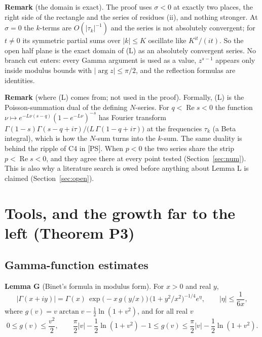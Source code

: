 \documentclass[11pt]{article}
\newcommand{\re}{\operatorname{Re}}
\begin{document}
\noindent\textbf{Remark} (the domain is exact). The proof uses $\sigma<0$ at exactly two places, the right side of the rectangle and the series of residues (ii), and nothing stronger. At $\sigma=0$ the $k$-terms are $O(|\tau_k|^{-1})$ and the series is not absolutely convergent; for $t\ne0$ its symmetric partial sums over $|k|\le K$ oscillate like $K^{it}/(it)$. So the open half plane is the exact domain of (L) as an absolutely convergent series. No branch cut enters: every Gamma argument is used as a value, $z^{s-1}$ appears only inside modulus bounds with $|\arg z|\le\pi/2$, and the reflection formulas are identities.

\medskip
\noindent\textbf{Remark} (where (L) comes from; not used in the proof). Formally, (L) is the Poisson-summation dual of the defining $N$-series. For $q<\re s<0$ the function $\nu\mapsto e^{-L\nu(s-q)}(1-e^{-L\nu})^{-s}$ has Fourier transform $\Gamma(1-s)\Gamma(s-q+i\tau)/\bigl(L\,\Gamma(1-q+i\tau)\bigr)$ at the frequencies $\tau_k$ (a Beta integral), which is how the $N$-sum turns into the $k$-sum. The same duality is behind the ripple of C4 in [PS]. When $p<0$ the two series share the strip $p<\re s<0$, and they agree there at every point tested (Section~\ref{sec:num}). This is also why a literature search is owed before anything about Lemma L is claimed (Section~\ref{sec:open}).

\section{Tools, and the growth far to the left (Theorem P3)}\label{sec:P3}

\subsection{Gamma-function estimates}

\noindent\textbf{Lemma G} (Binet's formula in modulus form). For $x>0$ and real $y$,
\[
|\Gamma(x+iy)|=\Gamma(x)\,\exp\bigl(-x\,g(y/x)\bigr)\,\bigl(1+y^2/x^2\bigr)^{-1/4}e^{\eta},\qquad|\eta|\le\frac{1}{6x},
\]
where $g(v)=v\arctan v-\frac12\ln(1+v^2)$, and for all real $v$
\[
0\le g(v)\le\frac{v^2}{2},\qquad \frac\pi2|v|-\frac12\ln(1+v^2)-1\le g(v)\le\frac\pi2|v|-\frac12\ln(1+v^2).
\]
\end{document}
